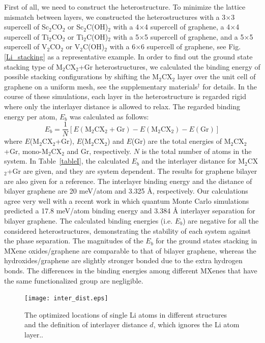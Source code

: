 First of all, we need to construct the heterostructure. To minimize the lattice mismatch between layers, we constructed the heterostructures with a 3$\times$3 supercell of Sc$_2$CO$_2$ or Sc$_2$C(OH)$_2$ with a 4$\times$4 supercell of graphene, a  4$\times$4 supercell of Ti$_2$CO$_2$ or Ti$_2$C(OH)$_2$ with a 5$\times$5 supercell of graphene, and a 5$\times$5 supercell of V$_2$CO$_2$ or V$_2$C(OH)$_2$ with a 6$\times$6 supercell of graphene, see Fig. \ref{Li_stacking} as a representative example. In order to find out the ground state stacking type of M$_2$CX$_2$+Gr heterostructures, we calculated the binding energy of possible stacking configurations by shifting the M$_2$CX$_2$ layer over the unit cell of graphene on a uniform mesh, see the supplementary materials$^\dag$ for details. In the course of these simulations, each layer in the heterostructure is regarded rigid where only the interlayer distance is allowed to relax. The regarded binding energy per atom, $E_b$ was calculated as follows:
\begin{equation}
E_b=\frac{1}{N}[E(\mathrm{M}_2\mathrm{C}\mathrm{X}_2+\mathrm{Gr})-E(\mathrm{M}_2\mathrm{C}\mathrm{X}_2)-E(\mathrm{Gr})]
\end{equation}
where $E$(M$_2$CX$_2$+Gr), $E$(M$_2$CX$_2$) and $E$(Gr) are the total energies of M$_2$CX$_2$+Gr, mono-M$_2$CX$_2$ and Gr, respectively. $N$ is the total number of atoms in the system. In Table~\ref{tableI}, the calculated $E_b$ and the interlayer distance for M$_2$CX$_2$+Gr are given, and they are system dependent. The results for graphene bilayer are also given for a reference. The interlayer binding energy and the distance of bilayer graphene are 20 meV/atom and 3.325 {\AA}, respectively. Our calculations agree very well with a recent work in which quantum Monte Carlo simulations predicted a 17.8 meV/atom binding energy and 3.384 {\AA} interlayer separation for bilayer graphene\cite{PhysRevLett.115.115501}.  The calculated binding energies (i.e. $E_b$) are negative for all the considered heterostructures, demonstrating the stability of each system against the phase separation. The magnitudes of the $E_b$ for the ground states stacking in MXene oxides/graphene are comparable to that of bilayer graphene, whereas the hydroxides/graphene are slightly stronger bonded due to the extra hydrogen bonds. The differences in the binding energies among different MXenes that have the same functionalized group are negligible. 



\begin{figure}[htb]
\centering
\texttt{[image: inter\_dist.eps]}%
\caption{The optimized locations of single Li atoms in different structures and the definition of interlayer distance $d$, which ignores the Li atom layer.\label{inter-dist}.}
\end{figure}

